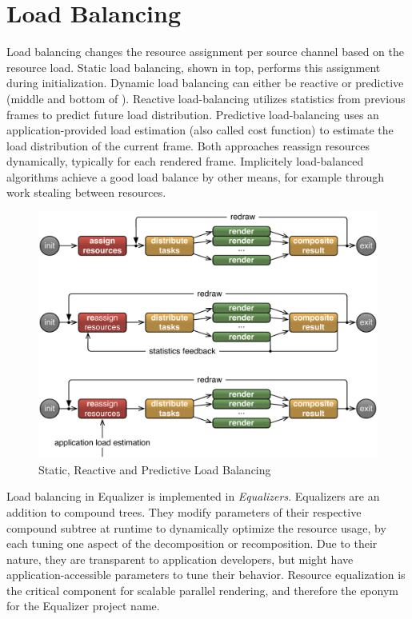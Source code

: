 \chapter{Load Balancing}\label{sLoadBalancing}

Load balancing changes the resource assignment per source channel based on the
resource load. Static load balancing, shown in  top,
performs this assignment during initialization. Dynamic load balancing can
either be reactive or predictive (middle and bottom of ).
Reactive load-balancing utilizes statistics from previous frames to predict
future load distribution. Predictive load-balancing uses an
application-provided load estimation (also called cost function) to estimate
the load distribution of the current frame. Both approaches reassign resources
dynamically, typically for each rendered frame. Implicitely load-balanced
algorithms achieve a good load balance by other means, for example through work
stealing between resources.

\begin{figure}[h!t]
  \includegraphics[width=\textwidth]{images/loadBalancing}
  \caption{\label{floadbalancing}Static, Reactive and Predictive Load Balancing}
\end{figure}

Load balancing in Equalizer is implemented in {\em Equalizers}. Equalizers are
an addition to compound trees. They modify parameters of their respective
compound subtree at runtime to dynamically optimize the resource usage, by each
tuning one aspect of the decomposition or recomposition. Due to their nature,
they are transparent to application developers, but might have
application-accessible parameters to tune their behavior. Resource equalization
is the critical component for scalable parallel rendering, and therefore the
eponym for the \textsf{Equalizer} project name.

